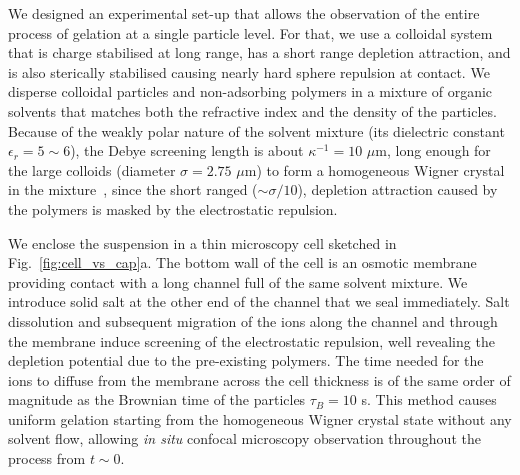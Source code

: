 \documentclass[preprint,footinbib,amsmath,amssymb]{revtex4}
\begin{document}




We designed an experimental set-up that allows the observation of the entire process of gelation at a single particle level. For that, we use a colloidal system that is charge stabilised at long range, has a short range depletion attraction, and is also sterically stabilised causing nearly hard sphere repulsion at contact. We disperse colloidal particles and non-adsorbing polymers in a  mixture of organic solvents that matches both the refractive index and the density of the particles. Because of the weakly polar nature of the solvent mixture (its dielectric constant $\epsilon_r = 5\sim6$), the Debye screening length is about $\kappa^{-1}=10$ $\mu$m, long enough for the large colloids (diameter $\sigma=2.75$ $\mu$m) to form a homogeneous Wigner crystal in the mixture~\cite{klix2010structural}, since the short ranged ($\sim \sigma/10$), depletion attraction caused by the polymers is masked by the electrostatic repulsion.

We enclose the suspension in a thin microscopy cell sketched in Fig.~\ref{fig:cell_vs_cap}a. The bottom wall of the cell is an osmotic membrane providing contact with a long channel full of the same solvent mixture. We introduce solid salt at the other end of the channel that we seal immediately. Salt dissolution and subsequent migration of the ions along the channel and through the membrane induce screening of the electrostatic repulsion, well revealing the depletion potential due to the pre-existing polymers. The time needed for the ions to diffuse from the membrane across the cell thickness is of the same order of magnitude as the Brownian time of the particles $\tau_B=10$ s. This method causes uniform gelation starting from the homogeneous Wigner crystal state without any solvent flow, allowing \textit{in situ} confocal microscopy observation throughout the process from $t \sim 0$.
\end{document}
